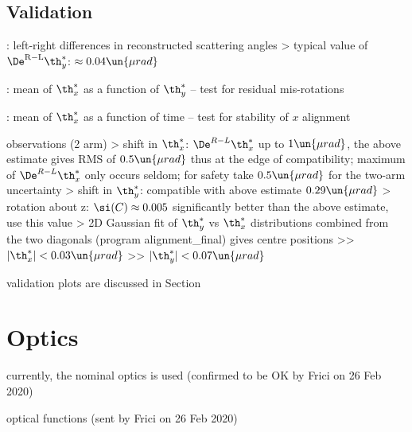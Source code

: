 \section[alignment-val]{Validation}

\> : left-right differences in reconstructed scattering angles
\>> typical value of $\De^{\rm R-L}\th^*_y$: $\approx 0.04\un{\mu rad}$

\> : mean of $\th_x^*$ as a function of $\th_y^*$ -- test for residual mis-rotations

\> :  mean of $\th_x^*$ as a function of time -- test for stability of $x$ alignment

\> observations (2 arm)
\>> shift in $\th_x^*$: $\De^{R-L} \th_x^*$ up to $1\un{\mu rad}$, the above estimate gives RMS of $0.5\un{\mu rad}$ thus at the edge of compatibility; maximum of $\De^{R-L} \th_x^*$ only occurs seldom; for safety take $0.5\un{\mu rad}$ for the two-arm uncertainty
\>> shift in $\th_y^*$: compatible with above estimate $0.29\un{\mu rad}$
\>> rotation about z: $\si(C) \approx 0.005$ significantly better than the above estimate, use this value
\>> 2D Gaussian fit of $\th^*_y$ vs $\th^*_x$ distributions combined from the two diagonals (program alignment\_final) gives centre positions
\>>> $|\th^*_x| < 0.03\un{\mu rad}$
\>>> $|\th^*_y| < 0.07\un{\mu rad}$

\fi

\> validation plots are discussed in Section 



\chapter[optics]{Optics}

\> currently, the nominal optics is used (confirmed to be OK by Frici on 26 Feb 2020)

\> optical functions (sent by Frici on 26 Feb 2020)

\centerline{\vbox{}}

